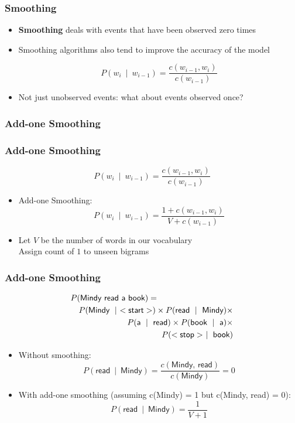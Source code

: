 \documentclass{beamer}
\begin{document}
\begin{frame}
\frametitle{Smoothing}
\begin{itemize}[<+->]

\item {\bf Smoothing} deals with events that have been observed zero times

\item Smoothing algorithms also tend to improve the accuracy of the model

\[ P(w_i~\mid~w_{i-1}) = \frac{ c(w_{i-1},w_i) } { c(w_{i-1}) } \]

\item Not just unobserved events: what about events observed once?
\end{itemize}
\end{frame}

\subsubsection{Add-one Smoothing}

\begin{frame}
\frametitle{Add-one Smoothing}
\[ P(w_i~\mid~w_{i-1}) = \frac{ c(w_{i-1},w_i) } { c(w_{i-1}) } \]
\begin{itemize}[<+->]
\item Add-one Smoothing:
\[ P(w_i~\mid~w_{i-1}) = \frac{ 1 + c(w_{i-1},w_i) } { V + c(w_{i-1}) } \]
\item Let $V$ be the number of words in our vocabulary \\
 Assign count of $1$ to unseen bigrams
\end{itemize}
\end{frame}

\begin{frame}
\frametitle{Add-one Smoothing}
\begin{eqnarray*}
\lefteqn{P(\textsf{Mindy read a book})=}\\
&& P(\textsf{Mindy}~\mid~<\textsf{start}>) \times P(\textsf{read}~\mid~\textsf{Mindy}) \times \\
&& P(\textsf{a}~\mid~\textsf{read}) \times P(\textsf{book}~\mid~\textsf{a}) \times \\
&& P(<\textsf{stop}>~\mid~\textsf{book})
\end{eqnarray*}
\begin{itemize}[<+->]
\item Without smoothing:
\[ P(\textsf{read}~\mid~\textsf{Mindy}) = \frac{ c(\textsf{Mindy, read}) } { c(\textsf{Mindy}) }  = 0 \]
\item With add-one smoothing (assuming c(Mindy) = 1 but c(Mindy, read)
  = 0):
\[ P(\textsf{read}~\mid~\textsf{Mindy}) = \frac{ 1 } { V + 1 }  \]
\end{itemize}
\end{frame}
\end{document}
